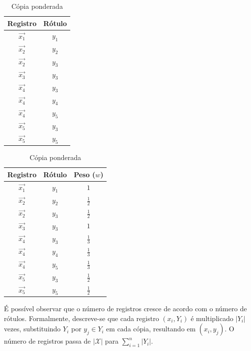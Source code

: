 \documentclass[runningheads,a4paper]{llncs}
\begin{document}
\begin{table}
\parbox{.45\linewidth}{
	\centering
	\begin{tabular}{| c | c |}
		\hline
		\textbf{Registro} & \textbf{Rótulo} \\
		\hline
		$\vec{x_1}$ & $y_1$ \\
		\hline
		$\vec{x_2}$ & $y_2$ \\
		\hline
		$\vec{x_2}$ & $y_3$ \\
		\hline
		$\vec{x_3}$ & $y_3$ \\
		\hline
		$\vec{x_4}$ & $y_3$ \\
		\hline
		$\vec{x_4}$ & $y_4$ \\
		\hline
		$\vec{x_4}$ & $y_5$ \\
		\hline
		$\vec{x_5}$ & $y_3$ \\
		\hline
		$\vec{x_5}$ & $y_5$ \\
		\hline
	\end{tabular}
	\caption{Transformação por cópia}
	\label{tab:excopia}
}
\parbox{.45\linewidth}{
	\centering
	\begin{tabular}{| c | c | c |}
		\hline
		\textbf{Registro} & \textbf{Rótulo} & \textbf{Peso ($w$)} \\
		\hline
		$\vec{x_1}$ & $y_1$ & $1$ \\
		\hline
		$\vec{x_2}$ & $y_2$ & $\frac{1}{2}$ \\
		\hline
		$\vec{x_2}$ & $y_3$ & $\frac{1}{2}$ \\
		\hline
		$\vec{x_3}$ & $y_3$ & $1$ \\
		\hline
		$\vec{x_4}$ & $y_3$ & $\frac{1}{3}$ \\
		\hline
		$\vec{x_4}$ & $y_4$ & $\frac{1}{3}$ \\
		\hline
		$\vec{x_4}$ & $y_5$ & $\frac{1}{3}$ \\
		\hline
		$\vec{x_5}$ & $y_3$ & $\frac{1}{2}$ \\
		\hline
		$\vec{x_5}$ & $y_5$ & $\frac{1}{2}$ \\
		\hline
	\end{tabular}
	\caption{Cópia ponderada}
	\label{tab:excopiapond}
}
\end{table}

É possível observar que o número de registros cresce de acordo com o número de rótulos. Formalmente, descreve-se que cada registro $(x_i,Y_i)$ é multiplicado $|Y_i|$ vezes, substituindo $Y_i$ por $y_j \in Y_i$ em cada cópia, resultando em $(x_{i}, y_j)$. O número de registros passa de $|\mathcal{X}|$ para $\sum_{i=1}^{n}|Y_i|$.
\end{document}
